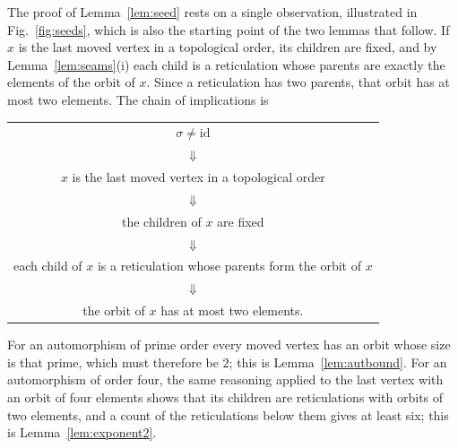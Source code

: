 \documentclass[11pt,a4paper]{article}
\theoremstyle{definition}
\begin{document}
The proof of Lemma~\ref{lem:seed} rests on a single observation, illustrated in Fig.~\ref{fig:seeds}, which is also the starting point of the two lemmas that follow. If $x$ is the last moved vertex in a topological order, its children are fixed, and by Lemma~\ref{lem:seams}(i) each child is a reticulation whose parents are exactly the elements of the orbit of $x$. Since a reticulation has two parents, that orbit has at most two elements. The chain of implications is
\begin{center}
\begin{tabular}{c}
$\sigma\neq\mathrm{id}$\\
$\Downarrow$\\
$x$ is the last moved vertex in a topological order\\
$\Downarrow$\\
the children of $x$ are fixed\\
$\Downarrow$\\
each child of $x$ is a reticulation whose parents form the orbit of $x$\\
$\Downarrow$\\
the orbit of $x$ has at most two elements.
\end{tabular}
\end{center}
For an automorphism of prime order every moved vertex has an orbit whose size is that prime, which must therefore be $2$; this is Lemma~\ref{lem:autbound}. For an automorphism of order four, the same reasoning applied to the last vertex with an orbit of four elements shows that its children are reticulations with orbits of two elements, and a count of the reticulations below them gives at least six; this is Lemma~\ref{lem:exponent2}.
\end{document}
